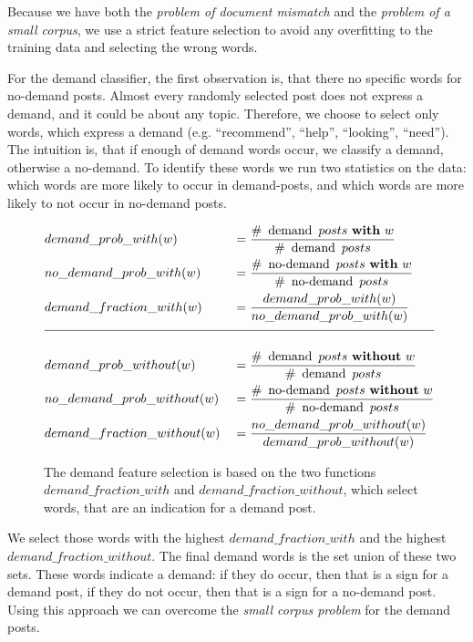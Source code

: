 Because we have both the \emph{problem of document mismatch} and the \emph{problem of a small corpus}, we use a strict feature selection to avoid any overfitting to the training data and selecting the wrong words.

For the demand classifier, the first observation is, that there no specific words for no-demand posts.
Almost every randomly selected post does not express a demand, and it could be about any topic.
Therefore, we choose to select only words, which express a demand (e.g. ``recommend'', ``help'', ``looking'', ``need'').
The intuition is, that if enough of demand words occur, we classify a demand, otherwise a no-demand.
To identify these words we run two statistics on the data:
which words are more likely to occur in demand-posts, and which words are more likely to not occur in no-demand posts.
\begin{figure}
	\label{eq:demand_feature_selection}
	\begin{alignat*}{3}
		&demand\_prob\_with(w) &&= \dfrac{
		 		\#~\operatorname{demand}~posts~\mathbf{with}~w
			}{
				 \#~\operatorname{demand}~posts
			}
			\\
		&no\_demand\_prob\_with(w) &&= \dfrac{
		 		\#~\operatorname{no-demand}~posts~\mathbf{with}~w
			}{
				 \#~\operatorname{no-demand}~posts
			}
			\\
		&demand\_fraction\_with(w) &&= \frac{
				demand\_prob\_with(w)
			}{
				no\_demand\_prob\_with(w)
			}
			\\[2mm]
			\hline
			\\[0.1mm]
		&demand\_prob\_without(w) &&= \dfrac{
		 		\#~\operatorname{demand}~posts~\mathbf{without}~w
			}{
				 \#~\operatorname{demand}~posts
			}
			\\
		&no\_demand\_prob\_without(w) &&= \dfrac{
		 		\#~\operatorname{no-demand}~posts~\mathbf{without}~w
			}{
				 \#~\operatorname{no-demand}~posts
			}
			\\
		&demand\_fraction\_without(w) &&= \frac{
				no\_demand\_prob\_without(w)
			}{
				demand\_prob\_without(w)
			}
	\end{alignat*}
	\caption{The demand feature selection is based on the two functions $demand\_fraction\_with$ and $demand\_fraction\_without$, which select words, that are an indication for a demand post.}
\end{figure}
We select those words with the highest $demand\_fraction\_with$ and the highest $demand\_fraction\_without$.
The final demand words is the set union of these two sets.
These words indicate a demand: if they do occur, then that is a sign for a demand post, if they do not occur, then that is a sign for a no-demand post.
Using this approach we can overcome the \emph{small corpus problem} for the demand posts.

